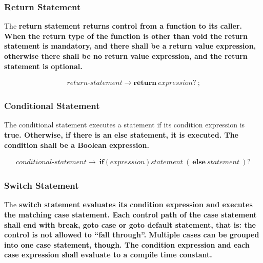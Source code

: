 \documentclass[a4paper,oneside,11pt]{article}
\begin{document}
\subsubsection{Return Statement}\label{returnstatement}

The \bf{return} statement returns control from a function to its caller.
When the return type of the function is other than \bf{void}
the return statement is mandatory, and
there shall be a return value expression,
otherwise there shall be no return value expression,
and the return statement is optional.

\begin{align*}
return\textrm{-}statement \rightarrow \textbf{return} \> \hyperref[expression]{expression}? \> \texttt{;}
\end{align*}

\subsubsection{Conditional Statement}\label{conditionalstatement}

The conditional statement executes a statement if its condition expression is \bf{true}.
Otherwise, if there is an else statement, it is executed.
The condition shall be a Boolean expression.

\begin{align*}
conditional\textrm{-}statement \rightarrow \> \textbf{if} \> \texttt{(} \> \hyperref[expression]{expression} \> \texttt{)}
\> \hyperref[statement]{statement} \> ( \> \textbf{else} \> \hyperref[statement]{statement} \> )?
\end{align*}

\subsubsection{Switch Statement}\label{switchstatement}

The \bf{switch} statement evaluates its condition expression
and executes the matching case statement.
Each control path of the \bf{case} statement shall
end with \bf{break}, \bf{goto case} or \bf{goto default} statement,
that is: the control is not allowed to ``fall through''.
Multiple cases can be grouped into one \bf{case} statement, though.
The condition expression and each case expression shall evaluate to a compile time constant.
\end{document}
